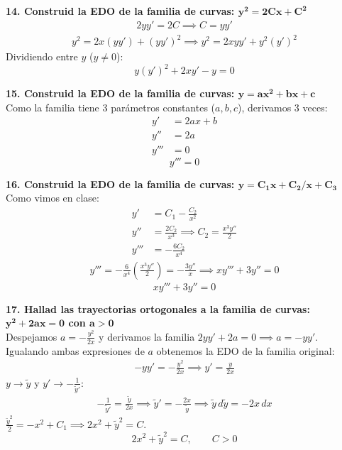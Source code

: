 \documentclass[11pt, a4paper]{article}
\begin{document}
\noindent\textbf{14. Construid la EDO de la familia de curvas: $\bm{y^2 = 2Cx + C^2}$} \\
\begin{align*}
2yy' = 2C \implies C = yy'
\end{align*}
\begin{align*}
y^2 = 2x(yy') + (yy')^2 \implies y^2 = 2xyy' + y^2(y')^2
\end{align*}
Dividiendo entre $y$ ($y \neq 0$):
\[
\boxed{y(y')^2 + 2xy' - y = 0}
\]


\noindent\textbf{15. Construid la EDO de la familia de curvas: $\bm{y = ax^2 + bx + c}$} \\
Como la familia tiene 3 parámetros constantes ($a, b, c$), derivamos 3 veces:
\begin{align*}
y' &= 2ax + b \\
y'' &= 2a \\
y''' &= 0
\end{align*}
\[
\boxed{y''' = 0}
\]


\noindent\textbf{16. Construid la EDO de la familia de curvas: $\bm{y = C_1 x + C_2/x + C_3}$} \\
Como vimos en clase:
\begin{align*}
y' &= C_1 - \frac{C_2}{x^2} \\
y'' &= \frac{2C_2}{x^3} \implies C_2 = \frac{x^3 y''}{2} \\
y''' &= -\frac{6C_2}{x^4}
\end{align*}
\begin{align*}
y''' = -\frac{6}{x^4}\left(\frac{x^3 y''}{2}\right) = -\frac{3y''}{x} \implies xy''' + 3y'' = 0
\end{align*}
\[
\boxed{xy''' + 3y'' = 0}
\]


\noindent\textbf{17. Hallad las trayectorias ortogonales a la familia de curvas: $\bm{y^2 + 2ax = 0}$ con $\bm{a>0}$} \\
Despejamos $a = -\frac{y^2}{2x}$ y derivamos la familia $2yy' + 2a = 0 \implies a = -yy'$.
Igualando ambas expresiones de $a$ obtenemos la EDO de la familia original:
\begin{align*}
-yy' = -\frac{y^2}{2x} \implies y' = \frac{y}{2x}
\end{align*}
$y \to \tilde{y}$ y $y' \to -\frac{1}{\tilde{y}'}$:
\begin{align*}
-\frac{1}{\tilde{y}'} = \frac{\tilde{y}}{2x} \implies \tilde{y}' = -\frac{2x}{\tilde{y}} \implies \tilde{y} \, d\tilde{y} = -2x \, dx
\end{align*}
$\frac{\tilde{y}^2}{2} = -x^2 + C_1 \implies 2x^2 + \tilde{y}^2 = C$.
\[
\boxed{2x^2 + \tilde{y}^2 = C, \qquad C > 0}
\]
\end{document}
